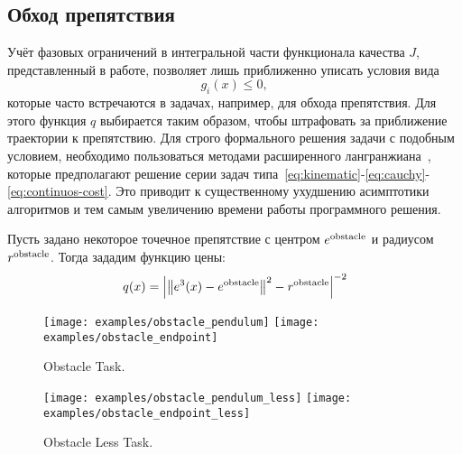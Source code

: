 \documentclass[../../doc.tex]{subfiles}
\begin{document}
    \subsection{Обход препятствия}
    \begin{remark}
        Учёт фазовых ограничений в интегральной части функционала качества $J$, представленный в работе,
        позволяет лишь приближенно уписать условия вида
        $$
            g_i(x) \leqslant 0,
        $$
        которые часто встречаются в задачах, например, для обхода препятствия.
        Для этого функция $q$ выбирается таким образом, чтобы штрафовать за приближение траектории к препятствию.
        Для строго формального решения задачи с подобным условием,
        необходимо пользоваться методами расширенного лангранжиана~\cite{birgin2009},
        которые предполагают решение серии задач типа~\eqref{eq:kinematic}-\eqref{eq:cauchy}-\eqref{eq:continuos-cost}.
        Это приводит к существенному ухудшению асимптотики алгоритмов и тем самым увеличению времени работы программного решения.
    \end{remark}
    Пусть задано некоторое точечное препятствие с центром $e^{\textnormal{obstacle}}$ и радиусом $r^{\textnormal{obstacle}}$.
    Тогда зададим функцию цены:
    \begin{equation*}
        q(x) = \left| \left\| e^3(x) - e^{\textnormal{obstacle}} \right\|^2 - r^{\textnormal{obstacle}} \right|^{-2}
    \end{equation*}

    \begin{figure}[h]
        \begin{center}
            \texttt{[image: examples/obstacle\_pendulum]}
            \texttt{[image: examples/obstacle\_endpoint]}
        \end{center}
        \caption{Obstacle Task.}
    \end{figure}
    \begin{figure}[h]
        \begin{center}
            \texttt{[image: examples/obstacle\_pendulum\_less]}
            \texttt{[image: examples/obstacle\_endpoint\_less]}
        \end{center}
        \caption{Obstacle Less Task.}
    \end{figure}

    \ifSubfilesClassLoaded{
        \nocite{*}
        \clearpage
        
        
    }{}
\end{document}
